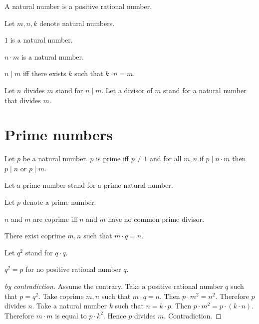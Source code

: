 \documentclass{article}
\begin{document}
  \begin{forthel}
    \begin{signature}
      A natural number is a positive rational number.
    \end{signature}

    Let $m, n, k$ denote natural numbers.

    \begin{signature}
        $1$ is a natural number.
    \end{signature}

    \begin{axiom}
      $n \cdot m$ is a natural number.
    \end{axiom}

    \begin{definition}
      $n \mid m$ iff there exists $k$ such that $k \cdot n = m$.
    \end{definition}

    Let $n$ divides $m$ stand for $n \mid m$. Let a divisor of $m$ stand for a natural number that divides $m$.
  \end{forthel}

  \section*{Prime numbers}

  \begin{forthel}
    \begin{definition}
      Let $p$ be a natural number.
      $p$ is prime iff $p\neq 1$ and for all $m, n$
      if $p\mid n\cdot m$ then $p \mid n$ or $p \mid m$.
    \end{definition}

    Let a prime number stand for a prime natural number.

    Let $p$ denote a prime number.

    \begin{definition}
      $n$ and $m$ are coprime iff $n$ and $m$ have no common prime divisor.
    \end{definition}

    \begin{axiom}
      There exist coprime $m,n$ such that $m \cdot q = n$.
    \end{axiom}

    Let $q^{2}$ stand for $q \cdot q$.

    \begin{proposition}
      $q^{2} = p$ for no positive rational number $q$.
    \end{proposition}
    \begin{proof}[by contradiction]
      Assume the contrary. 
      Take a positive rational number $q$ such that $p = q^{2}$. 
      Take coprime $m,n$ such that $m \cdot q = n$. 
      Then $p \cdot m^{2} = n^{2}$. 
      Therefore $p$ divides $n$. 
      Take a natural number $k$ such that $n = k \cdot p$. 
      Then $p \cdot m^{2} = p \cdot (k \cdot n)$. 
      Therefore $m \cdot m$ is equal to $p \cdot k^{2}$. 
      Hence $p$ divides $m$. 
      Contradiction.
    \end{proof}
  \end{forthel}
\end{document}
